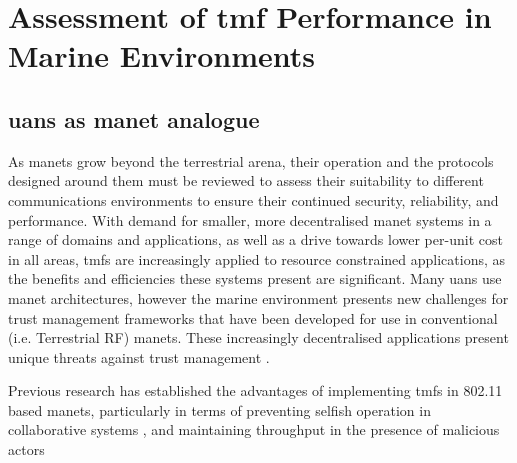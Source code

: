 
\chapter{Assessment of \gls{tmf} Performance in Marine Environments}
\label{ch:comms_trust}

\section{\glspl{uan} as \gls{manet} analogue}


As \glspl{manet} grow beyond the terrestrial arena, their operation and the protocols designed around them must be reviewed to assess their suitability to different communications environments to ensure their continued security, reliability, and performance.
With demand for smaller, more decentralised \gls{manet} systems in a range of domains and applications, as well as a drive towards lower per-unit cost in all areas, \glspl{tmf} are increasingly applied to resource constrained applications, as the benefits and efficiencies these systems present are significant.
Many \glspl{uan} use \gls{manet} architectures, however the marine environment presents new challenges for trust management frameworks that have been developed for use in conventional (i.e. Terrestrial RF) \glspl{manet}.
These increasingly decentralised applications present unique threats against trust management \cite{Caiti2011}.

Previous research has established the advantages of implementing \glspl{tmf} in 802.11 based \glspl{manet}, particularly in terms of preventing selfish operation in collaborative systems \cite{Li2007}, and maintaining throughput in the presence of malicious actors \cite{Buchegger2002}

